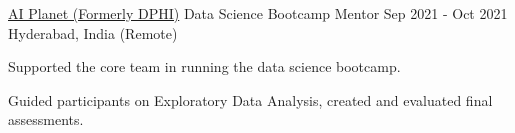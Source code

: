 \begin{cventries}
  \cventry
    {\href{https://blog.aiplanet.com/community}{AI Planet (Formerly DPHI)}} %
    {Data Science Bootcamp Mentor} %
    {Sep 2021 - Oct 2021} %
    {Hyderabad, India (Remote)} %
    {
      \begin{cvitems} %
        \item{Supported the core team in running the data science bootcamp.}
        \item{Guided participants on Exploratory Data Analysis, created and evaluated final assessments.}
      \end{cvitems}
    }

  
\end{cventries}
